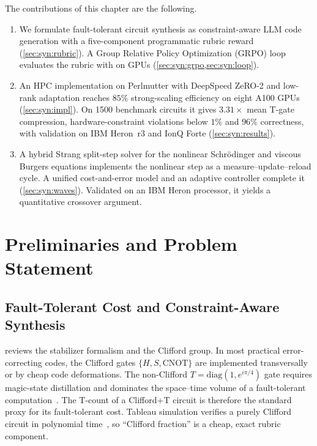 The contributions of this chapter are the following.
\begin{enumerate}
  \item We formulate fault-tolerant circuit synthesis as constraint-aware LLM code generation with a five-component programmatic rubric reward (\cref{sec:syn:rubric}). A Group Relative Policy Optimization (GRPO) loop evaluates the rubric with \cudaq{} on GPUs (\cref{sec:syn:grpo,sec:syn:loop}).
  \item An HPC implementation on Perlmutter with DeepSpeed ZeRO-2 and low-rank adaptation reaches $85\%$ strong-scaling efficiency on eight A100 GPUs (\cref{sec:syn:impl}). On \num{1500} benchmark circuits it gives $3.31\times$ mean T-gate compression, hardware-constraint violations below $1\%$ and $96\%$ correctness, with validation on IBM Heron~r3 and IonQ Forte (\cref{sec:syn:results}).
  \item A hybrid Strang split-step solver for the nonlinear Schr\"odinger and viscous Burgers equations implements the nonlinear step as a measure--update--reload cycle. A unified cost-and-error model and an adaptive controller complete it (\cref{sec:syn:waves}). Validated on an IBM Heron processor, it yields a quantitative crossover argument.
\end{enumerate}

\section{Preliminaries and Problem Statement}\label{sec:syn:prelim}

\subsection{Fault-Tolerant Cost and Constraint-Aware Synthesis}\label{sec:syn:ftcost}

 reviews the stabilizer formalism and the Clifford group. In most practical error-correcting codes, the Clifford gates $\{H, S, \mathrm{CNOT}\}$ are implemented transversally or by cheap code deformations. The non-Clifford $T=\mathrm{diag}(1,e^{i\pi/4})$ gate requires magic-state distillation and dominates the space--time volume of a fault-tolerant computation~\cite{bravyi2005magic,fowler2012surfacecodes}. The T-count of a Clifford+T circuit is therefore the standard proxy for its fault-tolerant cost. Tableau simulation verifies a purely Clifford circuit in polynomial time~\cite{gottesman1997stabilizer,aaronson2004stabilizer}, so ``Clifford fraction'' is a cheap, exact rubric component.


